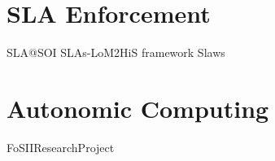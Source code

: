 \section{SLA Enforcement}
SLA@SOI
SLAs-LoM2HiS framework
Slaws
\section{Autonomic Computing}
FoSIIResearchProject

%
%
%
%
%
%
%
%
%

